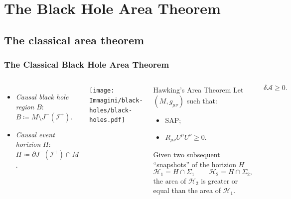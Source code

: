 \documentclass[]{beamer}
\begin{document}
	\section{The Black Hole Area Theorem}
	\subsection{The classical area theorem}
	\begin{frame}
		\frametitle{The Classical Black Hole Area Theorem}

		\begin{columns}
			\centering
			\begin{itemize}
				\item \emph{Causal black hole region} \(B\): \(B \coloneqq M \setminus J^-(\mathscr{I}^+)\).
				\item \emph{Causal event horizion} \(H\): \(H\coloneqq \partial J^-(\mathscr{I}^+) \cap M \).
			\end{itemize}	
			\texttt{[image: Immagini/black-holes/black-holes.pdf]}
			\begin{theoblock}{Hawking's Area Theorem}
				Let \((M, g_{\mu\nu})\) such that:
				\begin{itemize}
					\item SAP;
					\item \(R_{\mu\nu}U^{\mu}U^{\nu} \ge 0\).
				\end{itemize} 
				
				Given two subsequent ``snapshots'' of the horizion \(H\)
				\[
				\mathscr{H}_1 = H \cap \Sigma_1 \quad \quad \mathscr{H}_2 = H \cap \Sigma_2,
				\]
				the area of \(\mathscr{H}_2\) is greater or equal than the area of \(\mathscr{H}_1\).
			\end{theoblock}
			\begin{ideablock}{}
				\[
					\delta \mathcal{A} \ge 0.
				\]
			\end{ideablock}
		\end{columns}
	\end{frame}
\end{document}
